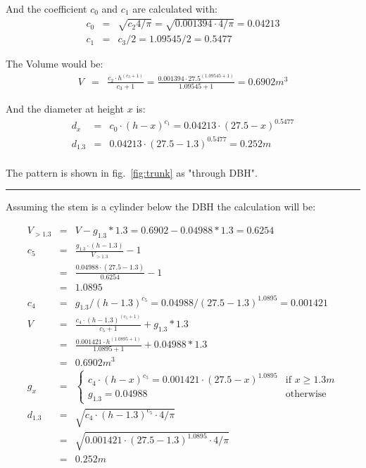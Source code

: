 \documentclass[twocolumn,10pt]{article}
\begin{document}
And the coefficient $c_0$ and $c_1$ are calculated with:
\begin{eqnarray*}
c_0 & = & \sqrt{c_2 4 / \pi} = \sqrt{0.001394 \cdot 4 / \pi} = 0.04213\\
c_1 & = & c_3/2 = 1.09545/2 = 0.5477
\end{eqnarray*}

The Volume would be:
\begin{eqnarray*}
V & = & \frac{c_2 \cdot h^{(c_3 + 1)}}{c_3 + 1} =
  \frac{0.001394 \cdot 27.5^{(1.09545 + 1)}}{1.09545 + 1} = 0.6902m^3
\end{eqnarray*}

And the diameter at height $x$ is:
\begin{eqnarray*}
d_x & = & c_0 \cdot (h - x)^{c_1} = 0.04213 \cdot (27.5 - x)^{0.5477}\\
d_{1.3} & = & 0.04213 \cdot (27.5 - 1.3)^{0.5477} = 0.252m\\
\end{eqnarray*}

The pattern is shown in fig.~\ref{fig:trunk} as "through DBH".

\par\noindent\rule{\columnwidth}{0.5pt}

Assuming the stem is a cylinder below the DBH the calculation will be:

\begin{eqnarray*}
V_{>1.3} & = & V - g_{1.3} * 1.3 = 0.6902 - 0.04988 * 1.3 = 0.6254\\
c_5 & = & \frac{g_{1.3} \cdot (h - 1.3)}{V_{>1.3}} - 1\\
  & = & \frac{0.04988 \cdot (27.5 - 1.3)}{0.6254} - 1\\
  & = & 1.0895\\
c_4 & = & g_{1.3} / (h-1.3)^{c_5} = 0.04988 / (27.5-1.3)^{1.0895} = 0.001421\\
V & = & \frac{c_4 \cdot (h-1.3)^{(c_5 + 1)}}{c_5 + 1} + g_{1.3} * 1.3\\
 & = & \frac{0.001421 \cdot h^{(1.0895 + 1)}}{1.0895 + 1} + 0.04988 * 1.3\\
 & = & 0.6902m^3\\
g_x & = & \begin{cases}
    c_4 \cdot (h - x)^{c_5} = 0.001421 \cdot (27.5 - x)^{1.0895} & \text{if } x\geq 1.3m\\
    g_{1.3} = 0.04988              & \text{otherwise}
    \end{cases}\\
d_{1.3} & = & \sqrt{c_4 \cdot (h - 1.3)^{c_5} \cdot 4/\pi}\\
 & = & \sqrt{0.001421 \cdot (27.5 - 1.3)^{1.0895} \cdot 4/\pi}\\
 & = & 0.252m
\end{eqnarray*}
\end{document}
